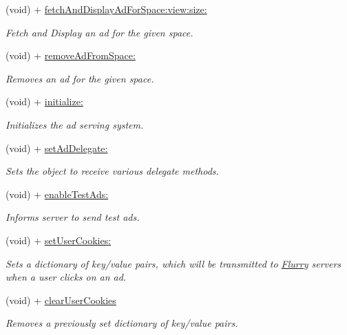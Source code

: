 \begin{DoxyCompactItemize}
(void) + \hyperlink{interfaceFlurryAds_a6015497d507dc4c08a3b03b3717711ea}{fetch\+And\+Display\+Ad\+For\+Space\+:view\+:size\+:}
\begin{DoxyCompactList}\small\item\em Fetch and Display an ad for the given {\ttfamily space}. \end{DoxyCompactList}\item 
(void) + \hyperlink{interfaceFlurryAds_aaf30e23048de55a1adb8a2c067428be6}{remove\+Ad\+From\+Space\+:}
\begin{DoxyCompactList}\small\item\em Removes an ad for the given {\ttfamily space}. \end{DoxyCompactList}\item 
(void) + \hyperlink{interfaceFlurryAds_a35a71c7b8775be1c95aefc4b1e6e236b}{initialize\+:}
\begin{DoxyCompactList}\small\item\em Initializes the ad serving system. \end{DoxyCompactList}\item 
(void) + \hyperlink{interfaceFlurryAds_a647e20365b75b7f0e4337660aa51b116}{set\+Ad\+Delegate\+:}
\begin{DoxyCompactList}\small\item\em Sets the object to receive various delegate methods. \end{DoxyCompactList}\item 
(void) + \hyperlink{interfaceFlurryAds_ab7060d936494e1ab82566c5592385837}{enable\+Test\+Ads\+:}
\begin{DoxyCompactList}\small\item\em Informs server to send test ads. \end{DoxyCompactList}\item 
(void) + \hyperlink{interfaceFlurryAds_ab24e531118ba482ff41fcf695a21de39}{set\+User\+Cookies\+:}
\begin{DoxyCompactList}\small\item\em Sets a dictionary of key/value pairs, which will be transmitted to \hyperlink{interfaceFlurry}{Flurry} servers when a user clicks on an ad. \end{DoxyCompactList}\item 
(void) + \hyperlink{interfaceFlurryAds_a5bd6c927d8116fe1c39ac47b9c7015d2}{clear\+User\+Cookies}
\begin{DoxyCompactList}\small\item\em Removes a previously set dictionary of key/value pairs. \end{DoxyCompactList}\item 

\end{DoxyCompactItemize}
